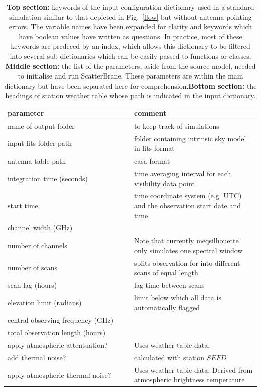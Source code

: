 \begin{longtable}{p{0.5\linewidth}|p{0.6\linewidth}}
\caption[List and explanation of keywords in the input configuration dictionary used in a standard simulation.]{{\bf Top section:} keywords of the input configuration dictionary used in a standard simulation similar to that depicted in Fig.~\ref{flow} but without antenna pointing errors. The variable names have been expanded for clarity and keywords which have boolean values have written as questions. In practice, most of these keywords are predeced by an index, which allows this dictionary to be filtered into several sub-dictionaries which can be easily passed to functions or classes. {\bf Middle section:} the list of the parameters, aside from the source model, needed to initialise and run {\sc ScatterBrane}. These parameters are within the main dictionary but have been separated here for comprehension.{\bf Bottom section:} the headings of station weather table whose path is indicated in the input dictionary.}\label{tab:parameters}\\
\hline
parameter&comment\\
\hline
name of output folder&to keep track of simulations\\
input fits folder path&folder containing intrinsic sky model in {\sc fits} format\\
antenna table path&{\sc casa} format \\
integration time (seconds)&time averaging interval for each visibility data point\\
start time&time coordinate system (e.g. UTC) and the observation start date and time\\
channel width (GHz)&\\
number of channels& Note that currently {\sc meqsilhouette} only simulates one spectral window\\
number of scans & splits observation for into different scans of equal length\\
scan lag (hours)& lag time between scans\\
elevation limit (radians) & limit below which all data is automatically flagged\\
central observing frequency (GHz)&\\
total observation length (hours)&\\
apply atmospheric attentuation?& Uses weather table data.\\
add thermal noise?&calculated with station $SEFD$\\
apply atmospheric thermal noise?& Uses weather table data. Derived from atmospheric brightness temperature \\

\end{longtable}
